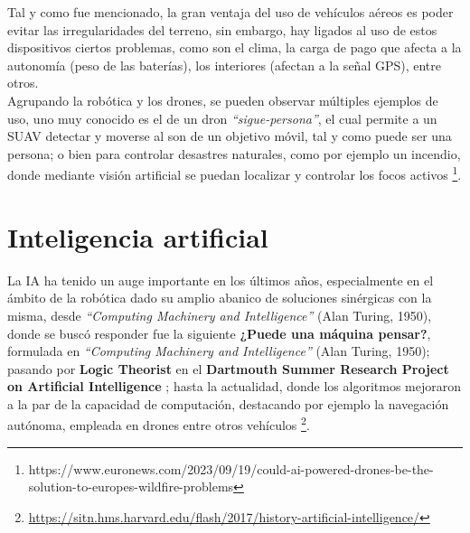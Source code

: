 Tal y como fue mencionado, la gran ventaja del uso de vehículos aéreos es poder evitar las irregularidades del terreno, sin embargo, hay ligados al uso de estos dispositivos ciertos problemas, como son el clima, la carga de pago que afecta a la autonomía (peso de las baterías), los interiores (afectan a la señal GPS), entre otros.\\

Agrupando la robótica y los drones, se pueden observar múltiples ejemplos de uso, uno muy conocido es el de un dron \emph{``sigue-persona''}, el cual permite a un \ac{SUAV} detectar y moverse al son de un objetivo móvil, tal y como puede ser una persona; o bien para controlar desastres naturales, como por ejemplo un incendio, donde mediante visión artificial se puedan localizar y controlar los focos activos \footnote[13]{https://www.euronews.com/2023/09/19/could-ai-powered-drones-be-the-solution-to-europes-wildfire-problems}.

\section{Inteligencia artificial}
\label{subsec:inteligencia_artificial}


La \ac{IA} ha tenido un auge importante en los últimos años, especialmente en el ámbito de la robótica dado su amplio abanico de soluciones sinérgicas con la misma, desde \emph{``Computing Machinery and Intelligence''} (Alan Turing, 1950), donde se buscó responder fue la siguiente \textbf{¿Puede una máquina pensar?}, formulada en \emph{``Computing Machinery and Intelligence''} (Alan Turing, 1950); pasando por \textbf{Logic Theorist} en el \textbf{Dartmouth Summer Research Project on Artificial Intelligence} \cite{logic-theorist}; hasta la actualidad, donde los algoritmos mejoraron a la par de la capacidad de computación, destacando por ejemplo la navegación autónoma, empleada en drones entre otros vehículos \footnote[14]{\url{https://sitn.hms.harvard.edu/flash/2017/history-artificial-intelligence/}}.\\

